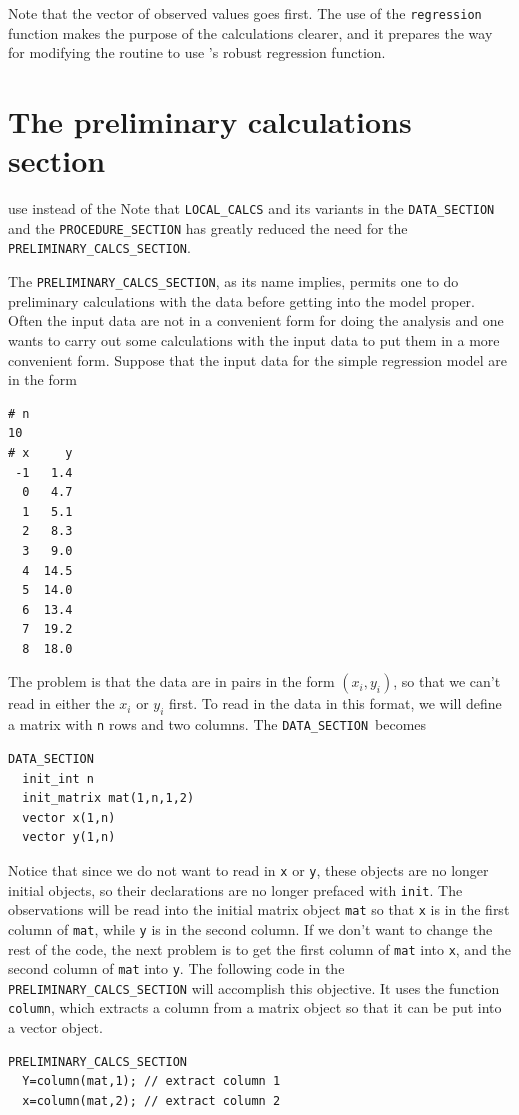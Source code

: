 \documentclass{admbmanual}
\newcommand\DS{\texttt{DATA\_SECTION}}
\begin{document}
Note that the vector of observed values goes first. The use of the
\texttt{regression} function makes the purpose of the calculations clearer, and
it prepares the way for modifying the routine to use \ADM's robust regression
function.

\section{The preliminary calculations section}

%
{use instead of the }
Note that \texttt{LOCAL\_CALCS} and its variants in the \texttt{DATA\_SECTION}
and the \texttt{PROCEDURE\_SECTION} has greatly reduced the need for the
\texttt{PRELIMINARY\_CALCS\_SECTION}.

The \texttt{PRELIMINARY\_CALCS\_SECTION}, as its name implies, permits one to do
preliminary calculations with the data before getting into the model proper.
Often the input data are not in a convenient form for doing the analysis and one
wants to carry out some calculations with the input data to put them in a more
convenient form. Suppose that the input data for the simple regression model are
in the form
\begin{lstlisting}
# n
10
# x     y
 -1   1.4
  0   4.7
  1   5.1
  2   8.3
  3   9.0
  4  14.5
  5  14.0
  6  13.4
  7  19.2
  8  18.0
\end{lstlisting}
The problem is that the data are in pairs in the form $(x_i,y_i)$, so that we
can't read in either the $x_i$ or $y_i$ first. To read in the data in this
format, we will define a matrix with \texttt{n} rows and two columns. The
\DS\ becomes
\begin{lstlisting}
DATA_SECTION
  init_int n
  init_matrix mat(1,n,1,2)
  vector x(1,n)
  vector y(1,n)
\end{lstlisting}
Notice that since we do not want to read in \texttt{x} or \texttt{y}, these
objects are no longer initial objects, so their declarations are no longer
prefaced with \texttt{init}. The observations will be read into the initial
matrix object \texttt{mat} so that \texttt{x} is in the first column of
\texttt{mat}, while \texttt{y} is in the second column. If we don't want to
change the rest of the code, the next problem is to get the first column of
\texttt{mat} into \texttt{x}, and the second column of \texttt{mat} into
\texttt{y}. The following code in the \texttt{PRELIMINARY\_CALCS\_SECTION} will
accomplish this objective. It uses the function \texttt{column}, which extracts
a column from a matrix object so that it can be put into a vector object.
\begin{lstlisting}
PRELIMINARY_CALCS_SECTION
  Y=column(mat,1); // extract column 1
  x=column(mat,2); // extract column 2
\end{lstlisting}
\end{document}
